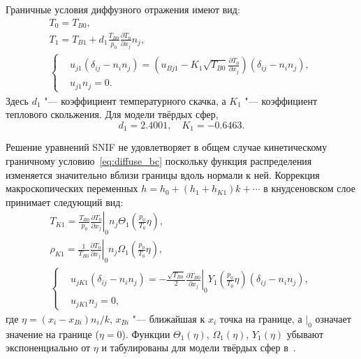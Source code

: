 \documentclass[10pt]{article}
\newcommand{\pder}[2][]{\frac{\partial#1}{\partial#2}}
\begin{document}
Граничные условия диффузного отражения имеют вид:
\begin{gather}
    T_0 = T_{B0}, \label{eq:bc_T0} \\
    T_1 = T_{B1} + d_1\frac{T_{B0}}{p_0}\pder[T_0]{x_j} n_j, \label{eq:bc_T1} \\
    \left\{
    \begin{aligned}
        & u_{j1} (\delta_{ij}-n_in_j) =
            \left(u_{Bj1} - K_1 \sqrt{T_{B0}} \pder[T_0]{x_j}\right) (\delta_{ij}-n_in_j), \\
        & u_{j1} n_j = 0.
    \end{aligned}
    \right. \label{eq:bc_u1}
\end{gather}
Здесь \(d_1\) "--- коэффициент температурного скачка, а \(K_1\) "--- коэффициент теплового скольжения.
Для модели твёрдых сфер,
\begin{equation}\label{eq:slip_coefficients}
    d_1 = 2.4001, \quad K_1 = -0.6463.
\end{equation}

Решение уравнений SNIF не удовлетворяет в общем случае кинетическому граничному условию~\eqref{eq:diffuse_bc}
поскольку функция распределения изменяется значительно вблизи границы вдоль нормали к ней.
Коррекция макроскопических переменных \(h = h_0 + (h_1 + h_{K1})k + \cdots\) в кнудсеновском слое
принимает следующий вид:
\begin{gather}
    T_{K1} = \frac{T_{B0}}{p_0}\left.\pder[T_0]{x_j}\right|_0 n_j
        \Theta_1\left(\frac{p_0}{T_0}\eta\right), \label{eq:correction_T} \\
    \rho_{K1} = \frac1{T_{B0}}\left.\pder[T_0]{x_j}\right|_0 n_j
        \Omega_1\left(\frac{p_0}{T_0}\eta\right), \label{eq:correction_rho} \\
    \left\{
    \begin{aligned}
        & u_{jK1} (\delta_{ij}-n_in_j) =
            -\frac{\sqrt{T_{B0}}}2 \left.\pder[T_{B0}]{x_j}\right|_0
            Y_1\left(\frac{p_0}{T_0}\eta\right) (\delta_{ij}-n_in_j), \\
        & u_{jK1} n_j = 0,
    \end{aligned}
    \right. \label{eq:correction_u}
\end{gather}
где \(\eta = (x_i-x_{Bi})n_i/k\), \(x_{Bi}\) "--- ближайшая к \(x_i\) точка на границе,
а \(|_0\) означает значение на границе (\(\eta=0\)).
Функции \(\Theta_1(\eta)\), \(\Omega_1(\eta)\), \(Y_1(\eta)\) убывают экспоненциально от \(\eta\)
и табулированы для модели твёрдых сфер в~\cite{Sone2002, Sone2007}.
\end{document}
